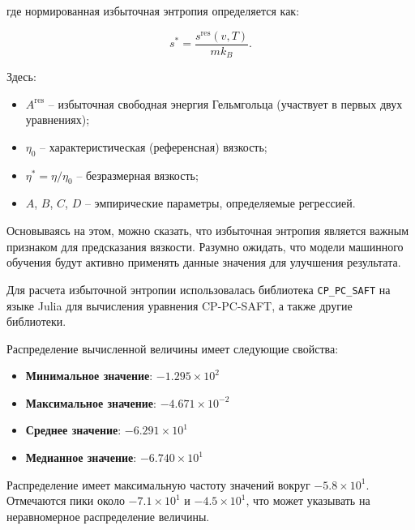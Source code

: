 \documentclass[a4paper,12pt]{article}
\begin{document}
      где нормированная избыточная энтропия определяется как:
      
      \begin{equation}
      s^* = \frac{s^{\text{res}}(v, T)}{m k_B}.
      \end{equation}
      
      Здесь:
      
      \begin{itemize}
        \item $A^{\text{res}}$ -- избыточная свободная энергия Гельмгольца (участвует в первых двух уравнениях);
        \item $\eta_0$ -- характеристическая (референсная) вязкость;
        \item $\eta^* = \eta / \eta_0$ -- безразмерная вязкость;
        \item $A$, $B$, $C$, $D$ -- эмпирические параметры, определяемые регрессией.
      \end{itemize}

      Основываясь на этом, можно сказать, что избыточная энтропия является важным признаком для предсказания вязкости. Разумно ожидать, что модели машинного обучения будут активно применять данные значения для улучшения результата.

      Для расчета избыточной энтропии использовалась библиотека \texttt{CP\_PC\_SAFT} на языке Julia для вычисления уравнения CP-PC-SAFT, а также другие библиотеки.

      Распределение вычисленной величины имеет следующие свойства:

      \begin{itemize}
          \item \textbf{Минимальное значение}: \(-1.295 \times 10^{2}\)
          \item \textbf{Максимальное значение}: \(-4.671 \times 10^{-2}\)
          \item \textbf{Среднее значение}: \(-6.291 \times 10^{1}\)
          \item \textbf{Медианное значение}: \(-6.740 \times 10^{1}\)
      \end{itemize}
      
      Распределение имеет максимальную частоту значений вокруг \(-5.8 \times 10^{1}\). Отмечаются пики около \(-7.1 \times 10^{1}\) и \(-4.5 \times 10^{1}\), что может указывать на неравномерное распределение величины.
      
\end{document}
